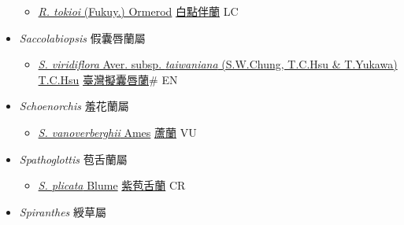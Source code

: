\begin{itemize}
  \begin{itemize}
        \item[] \href{http://www.theplantlist.org/tpl1.1/search?q=Rhomboda+tokioi}{\textit{R. tokioi} (Fukuy.) Ormerod}   \href{\detokenize{http://taibnet.sinica.edu.tw/chi/taibnet_species_list.php?T2=白點伴蘭&T2_new_value=true&fr=y}}{白點伴蘭} LC
  \end{itemize}
 \item[] \textit{Saccolabiopsis} 假囊唇蘭屬
                    
  \begin{itemize}
        \item[] \href{http://www.theplantlist.org/tpl1.1/search?q=Saccolabiopsis+viridiflora+subsp.+taiwaniana}{\textit{S. viridiflora} Aver. subsp. \textit{taiwaniana} (S.W.Chung, T.C.Hsu \& T.Yukawa) T.C.Hsu}   \href{\detokenize{http://taibnet.sinica.edu.tw/chi/taibnet_species_list.php?T2=臺灣擬囊唇蘭&T2_new_value=true&fr=y}}{臺灣擬囊唇蘭}\# EN
  \end{itemize}
 \item[] \textit{Schoenorchis} 羞花蘭屬
                    
  \begin{itemize}
        \item[] \href{http://www.theplantlist.org/tpl1.1/search?q=Schoenorchis+vanoverberghii}{\textit{S. vanoverberghii} Ames}   \href{\detokenize{http://taibnet.sinica.edu.tw/chi/taibnet_species_list.php?T2=蘆蘭&T2_new_value=true&fr=y}}{蘆蘭} VU
  \end{itemize}
 \item[] \textit{Spathoglottis} 苞舌蘭屬
                    
  \begin{itemize}
        \item[] \href{http://www.theplantlist.org/tpl1.1/search?q=Spathoglottis+plicata}{\textit{S. plicata} Blume}   \href{\detokenize{http://taibnet.sinica.edu.tw/chi/taibnet_species_list.php?T2=紫苞舌蘭&T2_new_value=true&fr=y}}{紫苞舌蘭} CR
  \end{itemize}
 \item[] \textit{Spiranthes} 綬草屬
                    

\end{itemize}
